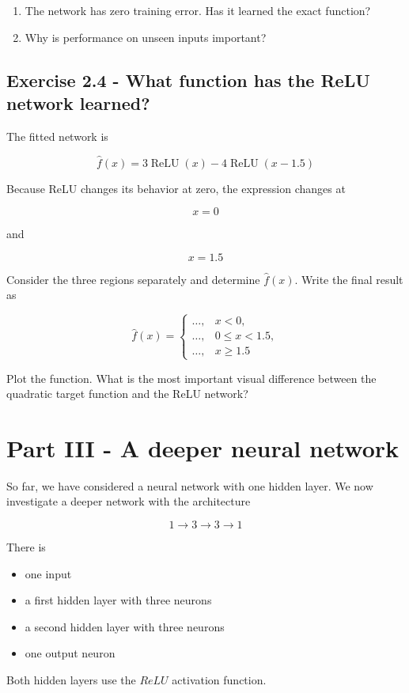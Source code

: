 \documentclass{course_sheet}
\begin{document}
\begin{enumerate}
\item
The network has zero training error. Has it learned the exact function?

\item
Why is performance on unseen inputs important?

\end{enumerate}
\subsection*{Exercise 2.4 - What function has the ReLU network learned?}
The fitted network is

\[
\hat f(x)=3\operatorname{ReLU}(x)-4\operatorname{ReLU}(x-1.5)
\]

Because ReLU changes its behavior at zero, the expression changes at

\[
x=0
\]

and

\[
x=1.5
\]

Consider the three regions separately and determine $\hat f(x)$. Write the final result as

\[
\hat f(x)=
\begin{cases}
\ldots, & x<0,\\
\ldots, & 0\leq x<1.5,\\
\ldots, & x\geq1.5
\end{cases}
\]

Plot the function. What is the most important visual difference between the quadratic target function and the ReLU network?

\clearpage
\section*{Part III - A deeper neural network}
So far, we have considered a neural network with one hidden layer. We now investigate a deeper network with the architecture

\[
1\rightarrow3\rightarrow3\rightarrow1
\]

There is

\begin{itemize}
\item
one input

\item
a first hidden layer with three neurons

\item
a second hidden layer with three neurons

\item
one output neuron

\end{itemize}
Both hidden layers use the $ReLU$ activation function.
\end{document}
